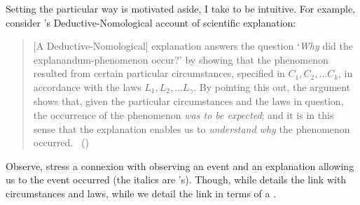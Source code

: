 \begin{note}
  \noindent%
  Setting the particular way \progEx{} is motivated aside, I take \progEx{} to be intuitive.
  For example, consider \citeauthor{Hempel:1965aa}'s Deductive-Nomological account of scientific explanation:
  \begin{quote}
    [A Deductive-Nomological] explanation answers the question
    `\emph{Why} did the explanandum-phenomenon occur?'
    by showing that the phenomenon resulted from certain particular circumstances, specified in \(C_{1}, C_{2}, \dots C_{k}\), in accordance with the laws \(L_{1}, L_{2}, \dots L_{\gamma}\).
    By pointing this out, the argument shows that, given the particular circumstances and the laws in question, the occurrence of the phenomenon \emph{was to be expected}; and it is in this sense that the explanation enables us to \emph{understand why} the phenomenon occurred.%
    \mbox{ }\hfill\mbox{(\citeyear[337]{Hempel:1965aa})}
  \end{quote}
  Observe, \citeauthor{Hempel:1965aa} stress a connexion with observing an event  and an explanation allowing us to  the event occurred (the italics are \citeauthor{Hempel:1965aa}'s).
  Though, while \citeauthor{Hempel:1965aa} details the link with circumstances and laws, while we detail the link in terms of a \se{}.
\end{note}



